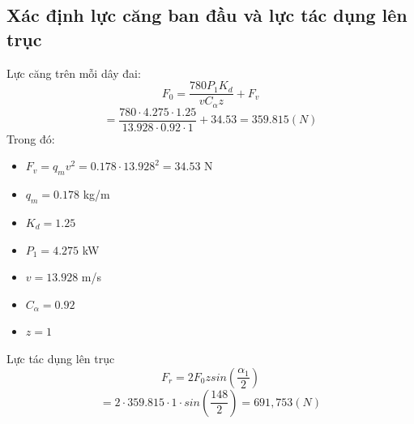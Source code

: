 \subsection{Xác định lực căng ban đầu và lực tác dụng lên trục}
Lực căng trên mỗi dây đai:
\[
    F_0 = \frac{780P_1K_d}{vC_\alpha z} + F_v 
\]
\[
    = \frac{780 \cdot 4.275 \cdot 1.25}{13.928 \cdot 0.92 \cdot 1} + 34.53 =  359.815 (N)
\]
Trong đó:
\begin{itemize}
    \item $F_v = q_mv^2 = 0.178 \cdot 13.928^2 = 34.53$ N
    \item $q_m = 0.178$ kg/m
    \item $K_d = 1.25$
    \item $P_1 = 4.275$ kW
    \item $v = 13.928$ m/s
    \item $C_\alpha = 0.92$ 
    \item $z = 1$
\end{itemize}
Lực tác dụng lên trục 
\[
    F_r = 2F_0zsin(\frac{\alpha_1}{2})
\]
\[
    = 2 \cdot 359.815 \cdot 1 \cdot sin(\frac{148}{2}) =  691,753 (N)
\]
\cleardoublepage